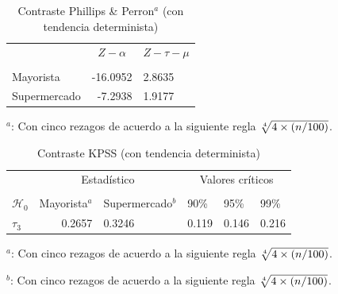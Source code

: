 \documentclass[12pt, twoside]{book}\usepackage[]{graphicx}\usepackage[]{color}
\numberwithin{equation}{section}
\numberwithin{theorem}{section}
\numberwithin{teorema}{section}
\numberwithin{defi}{section}
\numberwithin{prop}{section}
\numberwithin{defi}{section}
\theoremstyle{plain}
\begin{document}
\begin{table}[H]
\centering
\begin{threeparttable}
\caption{Contraste Phillips \& Perron$^{a}$ (con tendencia determinista)}
\begin{tabular}{@{}lrl@{}}
\toprule

 & \multicolumn{1}{c}{$Z-\alpha$} &
\multicolumn{1}{l}{$Z-\tau-\mu$}
\\
\cmidrule(l){2-2} \cmidrule(l){3-3} \\
Mayorista  & -16.0952 &  2.8635 \\
Supermercado & -7.2938 & 1.9177 \\
\bottomrule
\end{tabular}
\label{tab-5}
\begin{tablenotes}
\small 
\item $^{a}$: Con cinco rezagos de acuerdo a la siguiente regla $\root 4 \of {4 \times (n/100)}$. 
\end{tablenotes}
\end{threeparttable}
\end{table}



\begin{table}[H]
\centering
\begin{threeparttable}
\caption{Contraste KPSS (con tendencia determinista)}
\begin{tabular}{@{}lrllll@{}}
\toprule
\multicolumn{1}{l}{} & \multicolumn{2}{c}{Estadístico} &
\multicolumn{3}{c}{Valores críticos} \\
\cmidrule(l){2-3} \cmidrule(l){4-6} \\
\multicolumn{1}{l}{$\mathcal{H}_0$} & \multicolumn{1}{c}{Mayorista$^{a}$} &
 \multicolumn{1}{c}{Supermercado$^{b}$} &
\multicolumn{1}{l}{90\%}&
\multicolumn{1}{l}{95\%}&
\multicolumn{1}{l}{99\%}
\\
\midrule
$\tau_{3} $  & 0.2657 &  0.3246 & 0.119 & 0.146 & 0.216 \\
\bottomrule
\end{tabular}
\label{tab-6}
\begin{tablenotes}
\small 
\item $^{a}$: Con cinco rezagos de acuerdo a la siguiente regla $\root 4 \of {4 \times (n/100)}$. 
\item $^{b}$: Con cinco rezagos de acuerdo a la siguiente regla $\root 4 \of {4 \times (n/100)}$. 
\end{tablenotes}
\end{threeparttable}
\end{table}
\end{document}
